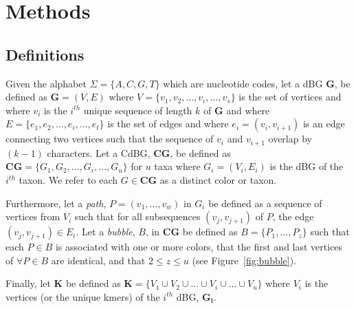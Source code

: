 \documentclass[hidelinks, 10pt, conference, compsocconf]{IEEEtran}
\begin{document}
\section{Methods}

\subsection{Definitions}

Given the alphabet $\Sigma = \{A, C, G, T\}$ which are nucleotide codes, let a dBG $\mathbf{G}$, be defined as $\mathbf{G} = (V, E)$ where $V = \{v_1, v_2, \ldots, v_i, \ldots, v_s\}$ is the set of vertices and where $v_i$ is the $i^{th}$ unique sequence of length $k$ of $\mathbf{G}$ and where $E = \{e_1, e_2, \ldots, e_i, \ldots, e_t\}$ is the set of edges and where $e_i = \left(v_i, v_{i+1}\right)$ is an edge connecting two vertices such that the sequence of $v_i$ and $v_{i+1}$ overlap by $(k-1)$ characters.
Let a CdBG, $\mathbf{CG}$, be defined as $\mathbf{CG} = \{G_1, G_2, \ldots, G_i, \ldots, G_u\}$ for $u$ taxa where $G_i = \left(V_i, E_i\right)$ is the dBG of the $i^{th}$ taxon.
We refer to each $G \in \mathbf{CG}$ as a distinct color or taxon.

Furthermore, let a \textit{path}, $P = \left(v_1,\ldots, v_w\right)$ in $G_i$ be defined as a sequence of vertices from $V_i$ such that for all subsequences $\left(v_j,v_{j+1}\right)$ of $P$, the edge $\left(v_j, v_{j+1}\right) \in E_i$. 
Let a \textit{bubble}, $B$, in $\mathbf{CG}$ be defined as $B = \{P_1, \ldots, P_z\}$ such that each $P \in B$ is associated with one or more colors, that the first and last vertices of $\forall P \in B$ are identical, and that $2 \leq z \leq u$ (see Figure~\ref{fig:bubble}).

Finally, let $\mathbf{K}$ be defined as $\mathbf{K} = \{V_1 \cup V_2 \cup \ldots \cup V_i \cup \ldots \cup V_u\}$ where $V_i$ is the vertices (or the unique kmers) of the $i^{th}$ dBG, $\mathbf{G_i}$.
\end{document}
